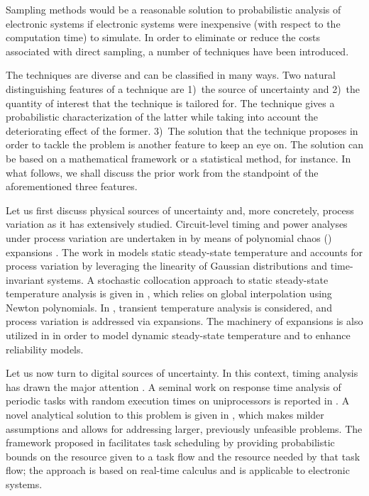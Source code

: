 Sampling methods would be a reasonable solution to probabilistic analysis of
electronic systems if electronic systems were inexpensive (with respect to the
computation time) to simulate. In order to eliminate or reduce the costs
associated with direct sampling, a number of techniques have been introduced.

The techniques are diverse and can be classified in many ways. Two natural
distinguishing features of a technique are 1)~the source of uncertainty and
2)~the quantity of interest that the technique is tailored for. The technique
gives a probabilistic characterization of the latter while taking into account
the deteriorating effect of the former. 3)~The solution that the technique
proposes in order to tackle the problem is another feature to keep an eye on.
The solution can be based on a mathematical framework or a statistical method,
for instance. In what follows, we shall discuss the prior work from the
standpoint of the aforementioned three features.

Let us first discuss physical sources of uncertainty and, more concretely,
process variation as it has extensively studied. Circuit-level timing and power
analyses under process variation are undertaken in \cite{bhardwaj2008} by means
of polynomial chaos () expansions \cite{xiu2010}. The work in
\cite{juan2012} models static steady-state temperature and accounts for process
variation by leveraging the linearity of Gaussian distributions and
time-invariant systems. A stochastic collocation \cite{xiu2010} approach to
static steady-state temperature analysis is given in \cite{lee2013}, which
relies on global interpolation using Newton polynomials. In \cite{ukhov2014},
transient temperature analysis is considered, and process variation is addressed
via  expansions. The machinery of  expansions is also utilized in
\cite{ukhov2015} in order to model dynamic steady-state temperature
\cite{ukhov2012} and to enhance reliability models.

Let us now turn to digital sources of uncertainty. In this context, timing
analysis has drawn the major attention \cite{quinton2012}. A seminal work on
response time analysis of periodic tasks with random execution times on
uniprocessors is reported in \cite{diaz2002}. A novel analytical solution to
this problem is given in \cite{tanasa2015}, which makes milder assumptions and
allows for addressing larger, previously unfeasible problems. The framework
proposed in \cite{santinelli2011} facilitates task scheduling by providing
probabilistic bounds on the resource given to a task flow and the resource
needed by that task flow; the approach is based on real-time calculus and is
applicable to electronic systems.

